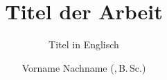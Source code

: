 \title{Titel der Arbeit}                            %
\subtitle{Titel in Englisch}                        %
\newcommand{\arbeitstyp}{M.\,Sc. / B.\,Sc. }        %
\newcommand{\Betreuer}{Name des Betreuers, M.\,Sc.} %
\newcommand{\abgabetermin}{tt.mm.jjjj}              %
\newcommand{\Arbeitsnummer}{20xx/xx}                %

\author{Vorname Nachname (,\,B.\,Sc.)}              %
\newcommand{\adresseI}{Musterweg 23}                %
\newcommand{\adresseII}{85748 Garching}             %
\newcommand{\telnr}{+49 12345678}                   %

\newcommand{\Ort}{Garching}

